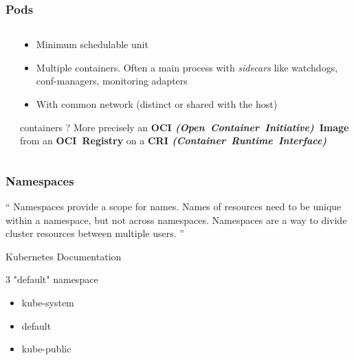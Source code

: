 \documentclass{beamer}
\begin{document}
\begin{frame}
  \frametitle{Pods}
  \begin{columns}
  \begin{column}{0.5\textwidth}
    \begin{center}
    \end{center}
  \end{column}
  \begin{column}{0.5\textwidth}
    \begin{itemize}
      \item<1-> Minimum schedulable unit
      \item<2-> Multiple containers. Often a main process with \textit{sidecars}
        like watchdogs, conf-managers, monitoring adapters
      \item<3-> With common network (distinct or shared with the host)
    \end{itemize}
    \begin{block}{containers ?}
        More precisely an {\bf OCI {\it (Open~Container~Initiative)}~Image} from an {\bf OCI~Registry}
        on a {\bf CRI {\it (Container~Runtime~Interface)}}

    \end{block}
  \end{column}
  \end{columns}
\end{frame}

\begin{frame}
  \frametitle{Namespaces}
  \enquote{
    Namespaces provide a scope for names. Names of resources need to be unique within a namespace, but not across namespaces.
    \newline
    Namespaces are a way to divide cluster resources between multiple users.
  }
  \newline

  \hfill Kubernetes Documentation

  \vfill
  \scriptsize{
    \begin{block}{3 "default" namespace}
    \begin{itemize}
      \item kube-system
      \item default
      \item kube-public
    \end{itemize}
    \end{block}
  }
\end{frame}
\end{document}
